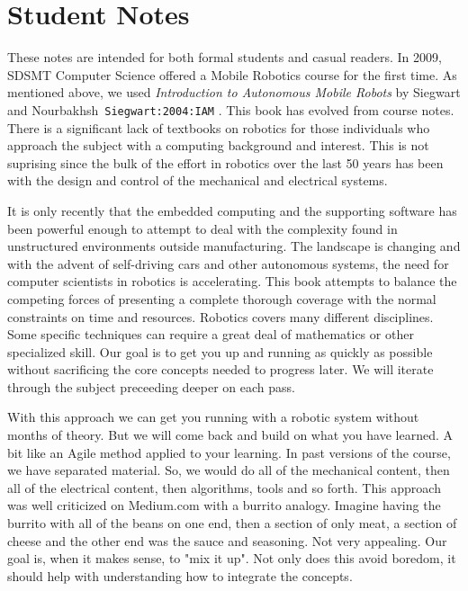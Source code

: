 \hypertarget{student-notes}{%
\section{Student Notes}\label{student-notes}}

These notes are intended for both formal students and casual readers. In
2009, SDSMT Computer Science offered a Mobile Robotics course for the
first time. As mentioned above, we used \emph{Introduction to Autonomous
Mobile Robots} by Siegwart and Nourbakhsh~\texttt{Siegwart:2004:IAM} .
This book has evolved from course notes. There is a significant lack of
textbooks on robotics for those individuals who approach the subject
with a computing background and interest. This is not suprising since
the bulk of the effort in robotics over the last 50 years has been with
the design and control of the mechanical and electrical systems.

It is only recently that the embedded computing and the supporting
software has been powerful enough to attempt to deal with the complexity
found in unstructured environments outside manufacturing. The landscape
is changing and with the advent of self-driving cars and other
autonomous systems, the need for computer scientists in robotics is
accelerating. This book attempts to balance the competing forces of
presenting a complete thorough coverage with the normal constraints on
time and resources. Robotics covers many different disciplines. Some
specific techniques can require a great deal of mathematics or other
specialized skill. Our goal is to get you up and running as quickly as
possible without sacrificing the core concepts needed to progress later.
We will iterate through the subject preceeding deeper on each pass.

With this approach we can get you running with a robotic system without
months of theory. But we will come back and build on what you have
learned. A bit like an Agile method applied to your learning. In past
versions of the course, we have separated material. So, we would do all
of the mechanical content, then all of the electrical content, then
algorithms, tools and so forth. This approach was well criticized on
Medium.com with a burrito analogy. Imagine having the burrito with all
of the beans on one end, then a section of only meat, a section of
cheese and the other end was the sauce and seasoning. Not very
appealing. Our goal is, when it makes sense, to "mix it up". Not only
does this avoid boredom, it should help with understanding how to
integrate the concepts.

